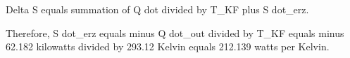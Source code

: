 Delta S equals summation of Q dot divided by T_KF plus S dot_erz.  

Therefore, S dot_erz equals minus Q dot_out divided by T_KF equals minus 62.182 kilowatts divided by 293.12 Kelvin equals 212.139 watts per Kelvin.